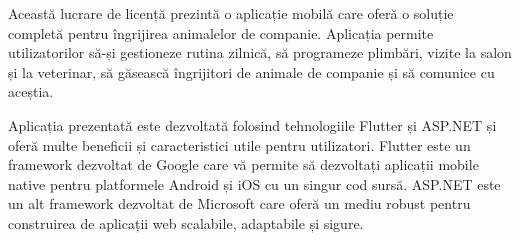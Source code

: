 Această lucrare de licență prezintă o aplicație mobilă care oferă o soluție completă pentru îngrijirea animalelor de companie. Aplicația permite utilizatorilor să-și gestioneze rutina zilnică, să programeze plimbări, vizite la salon și la veterinar, să găsească îngrijitori de animale de companie și să comunice cu aceștia.


Aplicația prezentată este dezvoltată folosind tehnologiile Flutter\cite{flutter_for_beginners} și ASP.NET\cite{introducing_asp_net_mvc} și oferă multe beneficii și caracteristici utile pentru utilizatori. Flutter este un framework dezvoltat de Google care vă permite să dezvoltați aplicații mobile native pentru platformele Android și iOS cu un singur cod sursă. ASP.NET este un alt framework dezvoltat de Microsoft care oferă un mediu robust pentru construirea de aplicații web scalabile\cite{flutter_framework}, adaptabile și sigure.